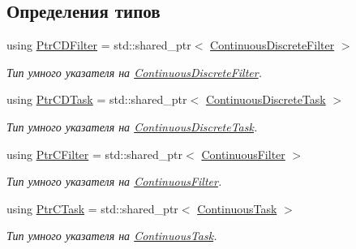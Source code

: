 \subsection*{Определения типов}
\begin{DoxyCompactItemize}
\item 
\hypertarget{namespace_core_a70dec7db05bb1e9e8d105d188633fe91}{}\label{namespace_core_a70dec7db05bb1e9e8d105d188633fe91} 
using \hyperlink{namespace_core_a70dec7db05bb1e9e8d105d188633fe91}{Ptr\+C\+D\+Filter} = std\+::shared\+\_\+ptr$<$ \hyperlink{class_core_1_1_continuous_discrete_filter}{Continuous\+Discrete\+Filter} $>$
\begin{DoxyCompactList}\small\item\em Тип умного указателя на \hyperlink{class_core_1_1_continuous_discrete_filter}{Continuous\+Discrete\+Filter}. \end{DoxyCompactList}\item 
\hypertarget{namespace_core_a4d5939b0284102299f3fb63d7552826a}{}\label{namespace_core_a4d5939b0284102299f3fb63d7552826a} 
using \hyperlink{namespace_core_a4d5939b0284102299f3fb63d7552826a}{Ptr\+C\+D\+Task} = std\+::shared\+\_\+ptr$<$ \hyperlink{class_core_1_1_continuous_discrete_task}{Continuous\+Discrete\+Task} $>$
\begin{DoxyCompactList}\small\item\em Тип умного указателя на \hyperlink{class_core_1_1_continuous_discrete_task}{Continuous\+Discrete\+Task}. \end{DoxyCompactList}\item 
\hypertarget{namespace_core_a83a912e3fc57bd838d6ddc39895999f3}{}\label{namespace_core_a83a912e3fc57bd838d6ddc39895999f3} 
using \hyperlink{namespace_core_a83a912e3fc57bd838d6ddc39895999f3}{Ptr\+C\+Filter} = std\+::shared\+\_\+ptr$<$ \hyperlink{class_core_1_1_continuous_filter}{Continuous\+Filter} $>$
\begin{DoxyCompactList}\small\item\em Тип умного указателя на \hyperlink{class_core_1_1_continuous_filter}{Continuous\+Filter}. \end{DoxyCompactList}\item 
\hypertarget{namespace_core_a95543587a560c6c497c6cadf68e03a62}{}\label{namespace_core_a95543587a560c6c497c6cadf68e03a62} 
using \hyperlink{namespace_core_a95543587a560c6c497c6cadf68e03a62}{Ptr\+C\+Task} = std\+::shared\+\_\+ptr$<$ \hyperlink{class_core_1_1_continuous_task}{Continuous\+Task} $>$
\begin{DoxyCompactList}\small\item\em Тип умного указателя на \hyperlink{class_core_1_1_continuous_task}{Continuous\+Task}. \end{DoxyCompactList}\item 

\end{DoxyCompactItemize}
